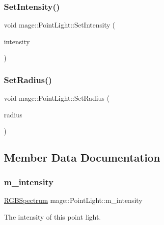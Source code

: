 \subsubsection{\texorpdfstring{Set\+Intensity()}{SetIntensity()}}
{\footnotesize\ttfamily void mage\+::\+Point\+Light\+::\+Set\+Intensity (\begin{DoxyParamCaption}\item[{const \hyperlink{structmage_1_1_r_g_b_spectrum}{R\+G\+B\+Spectrum} \&}]{intensity }\end{DoxyParamCaption})}

\hypertarget{classmage_1_1_point_light_ae7b4c301c148bd78348e26e5b6ad8faf}{}\label{classmage_1_1_point_light_ae7b4c301c148bd78348e26e5b6ad8faf} 
\subsubsection{\texorpdfstring{Set\+Radius()}{SetRadius()}}
{\footnotesize\ttfamily void mage\+::\+Point\+Light\+::\+Set\+Radius (\begin{DoxyParamCaption}\item[{float}]{radius }\end{DoxyParamCaption})}



\subsection{Member Data Documentation}
\hypertarget{classmage_1_1_point_light_ac021a08c4c700c3b19de5f7491a80e4f}{}\label{classmage_1_1_point_light_ac021a08c4c700c3b19de5f7491a80e4f} 
\subsubsection{\texorpdfstring{m\+\_\+intensity}{m\_intensity}}
{\footnotesize\ttfamily \hyperlink{structmage_1_1_r_g_b_spectrum}{R\+G\+B\+Spectrum} mage\+::\+Point\+Light\+::m\+\_\+intensity\hspace{0.3cm}{\ttfamily [private]}}

The intensity of this point light. \hypertarget{classmage_1_1_point_light_a96a5802cc2b06df700f63f8e8a9683eb}{}\label{classmage_1_1_point_light_a96a5802cc2b06df700f63f8e8a9683eb} 
